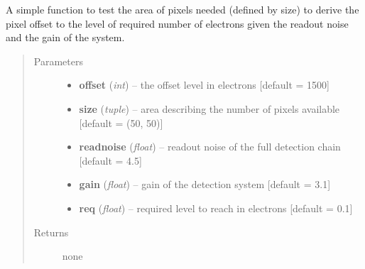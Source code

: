 \documentclass[a4paper,11pt,english]{sphinxmanual}
\begin{document}

\begin{fulllineitems}
\label{reduction:analysis.biasCalibration.simpleAnalytical}
A simple function to test the area of pixels needed (defined by size) to derive the
pixel offset to the level of required number of electrons given the readout noise and
the gain of the system.
\begin{quote}\begin{description}
\item[{Parameters}] \leavevmode\begin{itemize}
\item {} 
\textbf{offset} (\emph{int}) -- the offset level in electrons {[}default = 1500{]}

\item {} 
\textbf{size} (\emph{tuple}) -- area describing the number of pixels available {[}default = (50, 50){]}

\item {} 
\textbf{readnoise} (\emph{float}) -- readout noise of the full detection chain {[}default = 4.5{]}

\item {} 
\textbf{gain} (\emph{float}) -- gain of the detection system {[}default = 3.1{]}

\item {} 
\textbf{req} (\emph{float}) -- required level to reach in electrons {[}default = 0.1{]}

\end{itemize}

\item[{Returns}] \leavevmode
none

\end{description}\end{quote}

\end{fulllineitems}

\end{document}
